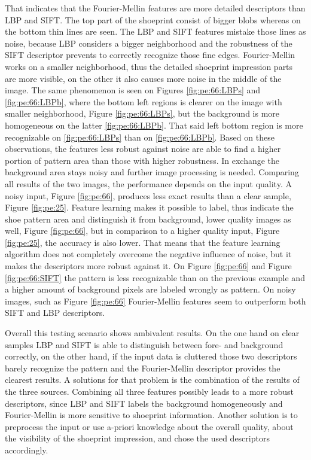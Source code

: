 \documentclass[draft,final]{vutinfth} %
\begin{document}
That indicates that the Fourier-Mellin features are more detailed descriptors than LBP and SIFT. 
The top part of the shoeprint consist of bigger blobs whereas on the bottom thin lines are seen.
The LBP and SIFT features mistake those lines as noise, because LBP considers a bigger neighborhood and the robustness of the SIFT descriptor prevents to correctly recognize those fine edges.
Fourier-Mellin works on a smaller neighborhood, thus the detailed shoeprint impression parts are more visible, on the other it also causes more noise in the middle of the image.
The same phenomenon is seen on Figures  \ref{fig:pe:66:LBPs} and  \ref{fig:pe:66:LBPb}, where the bottom left regions is clearer on the image  with smaller neighborhood, Figure \ref{fig:pe:66:LBPs}, but the background is more homogeneous on the latter \ref{fig:pe:66:LBPb}. 
That said left bottom region is more recognizable on  \ref{fig:pe:66:LBPs} than on  \ref{fig:pe:66:LBPb}.
Based on these observations,  the features less robust against noise are able to find a higher portion of pattern area than those with higher robustness.
In exchange the background area stays noisy and further image processing is needed.
Comparing all results of the two images, the performance depends on the input quality.
A noisy input, Figure \ref{fig:pe:66}, produces less exact results than a clear sample, Figure \ref{fig:pe:25}.
Feature learning makes it possible to label, thus indicate the shoe pattern area and distinguish it from background, lower quality images as well,  Figure \ref{fig:pe:66}, but in comparison to a higher quality input, Figure \ref{fig:pe:25}, the accuracy is also lower.
That means that the feature learning algorithm does not completely overcome the negative influence of noise, but it makes the descriptors more robust against it.
On Figure \ref{fig:pe:66} and Figure \ref{fig:pe:66:SIFT} the pattern is less recognizable than on the previous example and a higher amount of background pixels are labeled wrongly as pattern.
On noisy images, such as Figure \ref{fig:pe:66} Fourier-Mellin features seem to outperform both SIFT and LBP descriptors.
\par
Overall this testing scenario shows ambivalent results.
On the one hand on clear samples LBP and SIFT is able to distinguish between fore- and background correctly, on the other hand, if the input data is cluttered those two descriptors barely recognize the pattern and the Fourier-Mellin descriptor provides the clearest results.
A solutions for that problem is the combination of the results of the three sources.
Combining all three features possibly leads to a more robust  descriptors, since LBP and SIFT labels the background homogeneously and Fourier-Mellin is more sensitive to shoeprint information.
Another solution is to preprocess the input or use a-priori knowledge about the overall quality, about the visibility of the shoeprint impression, and chose the used descriptors accordingly.
\end{document}
